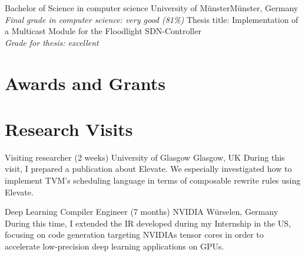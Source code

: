 \documentclass[11pt,a4paper]{moderncv}
\begin{document}
					{Bachelor of Science in computer science}
					{University of Münster}{Münster, Germany}
					{\textit{Final grade in computer science: very good (81\%)}}
					{Thesis title: Implementation of a Multicast Module for the Floodlight SDN-Controller \\
					 \textit{Grade for thesis: excellent}
					}
\section{Awards and Grants}


\section{Research Visits}
					{Visiting researcher (2 weeks)}
					{University of Glasgow}
					{Glasgow, UK}{}
					{During this visit, I prepared a publication about Elevate. We especially investigated how to implement TVM's scheduling language in terms of composable rewrite rules using Elevate.
					}


					{Deep Learning Compiler Engineer (7 months)}
					{NVIDIA}
					{W\"urselen, Germany}{}
					{
                    During this time, I extended the IR developed during my Internship in the US, focusing on code generation targeting NVIDIAs tensor cores in order to accelerate low-precision deep learning applications on GPUs.
                    }
\end{document}
